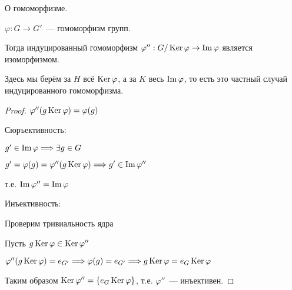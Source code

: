 \begin{theorem-non}
    О гомоморфизме.

    $\varphi: G \to G'$~--- гомоморфизм групп.
    
    Тогда индуцированный гомоморфизм
    $\varphi'': G / \operatorname{Ker} \varphi \to \operatorname{Im} \varphi$
    является изоморфизмом.
    
    Здесь мы берём за $H$ всё $\operatorname{Ker} \varphi$, а за $K$ весь $\operatorname{Im} \varphi$,
    то есть это частный случай индуцированного гомоморфизма.

    \begin{proof}
        $\varphi''(g\operatorname{Ker} \varphi) = \varphi(g)$

        Сюръективность:

        $g' \in \operatorname{Im} \varphi \Longrightarrow \exists g \in G$

        $g' = \varphi(g) = \varphi''(g \operatorname{Ker} \varphi) \Longrightarrow g' \in \operatorname{Im} \varphi''$

        т.е. $\operatorname{Im} \varphi'' = \operatorname{Im} \varphi $

        Инъективность:

        Проверим тривиальность ядра

        Пусть $g \operatorname{Ker} \varphi \in \operatorname{Ker} \varphi''$

        $\varphi''(g  \operatorname{Ker} \varphi ) = e_{G'} \Longrightarrow \varphi(g) = e_{G'} \Longrightarrow g \operatorname{Ker} \varphi = e_{G} \operatorname{Ker} \varphi$

        Таким образом $\operatorname{Ker} \varphi'' = \{ e_{G} \operatorname{Ker} \varphi \}$, т.е. $\varphi''$~--- инъективен.
        
    \end{proof}
\end{theorem-non}

